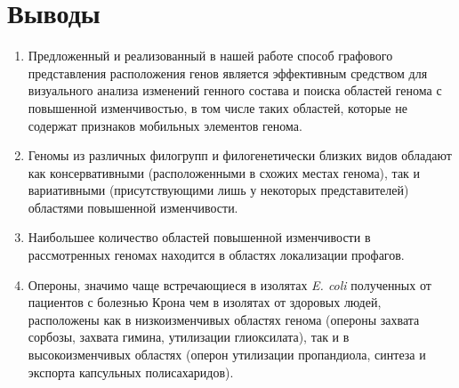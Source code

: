 \section*{Выводы} 
\begin{enumerate}
\item Предложенный и реализованный в нашей работе способ графового представления расположения генов является эффективным средством для визуального анализа изменений генного состава и поиска областей генома с повышенной изменчивостью, в том числе таких областей, которые не содержат признаков мобильных элементов генома.

\item Геномы из различных филогрупп и филогенетически близких видов обладают как консервативными (расположенными в схожих местах генома), так и вариативными (присутствующими лишь у некоторых представителей) областями повышенной изменчивости.

\item Наибольшее количество областей повышенной изменчивости в рассмотренных геномах находится в областях локализации профагов.

\item Опероны, значимо чаще встречающиеся в изолятах \textit{E. coli} полученных от пациентов с болезнью Крона чем в изолятах от здоровых людей, расположены как в низкоизменчивых областях генома (опероны захвата сорбозы, захвата гимина, утилизации глиоксилата), так и в высокоизменчивых областях (оперон утилизации пропандиола, синтеза и экспорта капсульных полисахаридов).
\end{enumerate}



